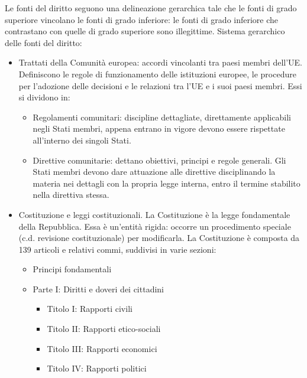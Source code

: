 Le fonti del diritto seguono una delineazione gerarchica tale che le fonti di
grado superiore vincolano le fonti di grado inferiore: le fonti di grado inferiore
che contrastano con quelle di grado superiore sono illegittime.\newline
Sistema gerarchico delle fonti del diritto:
\begin{itemize}
    \item Trattati della Comunità europea: accordi vincolanti tra paesi membri dell'UE. Definiscono
        le regole di funzionamento delle istituzioni europee, le procedure per l'adozione
        delle decisioni e le relazioni tra l'UE e i suoi paesi membri.\newline
        Essi si dividono in:
        \begin{itemize}
            \item Regolamenti comunitari: discipline dettagliate, direttamente applicabili negli Stati 
                membri, appena entrano in vigore devono essere rispettate all'interno dei singoli Stati.
            \item Direttive comunitarie: dettano obiettivi, principi e regole generali. Gli Stati
                membri devono dare attuazione alle direttive disciplinando la materia nei dettagli 
                con la propria legge interna, entro il termine stabilito nella direttiva stessa.
        \end{itemize}
    \item Costituzione e leggi costituzionali.\newline
        La Costituzione è la legge fondamentale della Repubblica. Essa è un'entità rigida: occorre
        un procedimento speciale (c.d. revisione costituzionale) per modificarla.\newline
        La Costituzione è composta da 139 articoli e relativi commi, suddivisi in varie sezioni:
        \begin{itemize}
            \item Principi fondamentali
            \item Parte I: Diritti e doveri dei cittadini
                \begin{itemize}
                    \item Titolo I: Rapporti civili
                    \item Titolo II: Rapporti etico-sociali
                    \item Titolo III: Rapporti economici
                    \item Titolo IV: Rapporti politici

\end{itemize}
\end{itemize}
\end{itemize}
